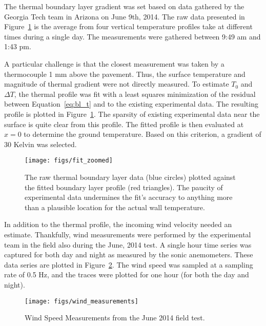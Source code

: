 The thermal boundary layer gradient was set based on data gathered by 
the Georgia Tech team in Arizona on June 9th, 2014. The raw data
presented in Figure~\ref{fig:thermal_profile_fit} is the average from
four vertical temperature profiles take at different times during a
single day. The measurements were gathered between 9:49 am and 1:43
pm\cite{ann_comm}.  

A particular challenge is that the closest measurement was taken by a 
thermocouple 1 mm above the pavement. Thus, the surface temperature and
magnitude of thermal gradient were not directly measured. To estimate
$T_0$ and $\Delta T$, the thermal profile was fit with a least squares
minimization of the residual between Equation~\ref{eq:bl_t} and to the
existing experimental data. The resulting profile is plotted in
Figure~\ref{fig:thermal_profile_fit}. The sparsity of existing
experimental data near the surface is quite clear from this
profile. The fitted profile is then evaluated at $x=0$ to determine the
ground temperature. Based on this criterion, a gradient of 30 Kelvin was
selected.   

 \begin{figure}[!htb]
  \begin{center}
   \texttt{[image: figs/fit\_zoomed]}
   \caption{The raw thermal boundary layer data (blue circles) plotted
   against the fitted boundary layer profile (red triangles). The
   paucity of experimental data undermines the fit's accuracy to
   anything more than a plausible location for the actual wall
   temperature. }  
   \label{fig:thermal_profile_fit}
  \end{center}
 \end{figure}

In addition to the thermal profile, the incoming wind velocity needed an 
estimate. Thankfully, wind measurements were performed by the
experimental team in the field also during the June, 2014 test. A single 
hour time series was captured for both day and night as measured by the
sonic anemometers. These data series are plotted in
Figure~\ref{fig:wind_speed_estimate}. The wind speed was sampled at a
sampling rate of 0.5 Hz, and the traces were plotted for one hour (for
both the day and night). 

 \begin{figure}[!htb]
  \begin{center}
   \texttt{[image: figs/wind\_measurements]}
   \caption{Wind Speed Measurements from the June 2014 field test.}
   \label{fig:wind_speed_estimate}
  \end{center}
 \end{figure}

